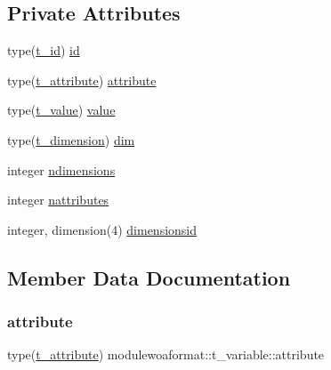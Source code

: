 \subsection*{Private Attributes}
\begin{DoxyCompactItemize}
\item 
type(\mbox{\hyperlink{structmodulewoaformat_1_1t__id}{t\+\_\+id}}) \mbox{\hyperlink{structmodulewoaformat_1_1t__variable_ad05690373ef83e0f32abd5dc5c2b76ca}{id}}
\item 
type(\mbox{\hyperlink{structmodulewoaformat_1_1t__attribute}{t\+\_\+attribute}}) \mbox{\hyperlink{structmodulewoaformat_1_1t__variable_aae9db64c84077262df5609101605bcf6}{attribute}}
\item 
type(\mbox{\hyperlink{structmodulewoaformat_1_1t__value}{t\+\_\+value}}) \mbox{\hyperlink{structmodulewoaformat_1_1t__variable_af0561c343e65e87d785749c5348be26f}{value}}
\item 
type(\mbox{\hyperlink{structmodulewoaformat_1_1t__dimension}{t\+\_\+dimension}}) \mbox{\hyperlink{structmodulewoaformat_1_1t__variable_a9e2c901743ade53253e35b5c8b948d4b}{dim}}
\item 
integer \mbox{\hyperlink{structmodulewoaformat_1_1t__variable_a76723a99321cec729b57508c62a3fca1}{ndimensions}}
\item 
integer \mbox{\hyperlink{structmodulewoaformat_1_1t__variable_acdc13b0d9ff1fb9b420c592d32bf1fa1}{nattributes}}
\item 
integer, dimension(4) \mbox{\hyperlink{structmodulewoaformat_1_1t__variable_ae02eac9694ef5e3203105b2ef8460f66}{dimensionsid}}
\end{DoxyCompactItemize}


\subsection{Member Data Documentation}
\mbox{\label{structmodulewoaformat_1_1t__variable_aae9db64c84077262df5609101605bcf6}} 
\subsubsection{\texorpdfstring{attribute}{attribute}}
{\footnotesize\ttfamily type(\mbox{\hyperlink{structmodulewoaformat_1_1t__attribute}{t\+\_\+attribute}}) modulewoaformat\+::t\+\_\+variable\+::attribute\hspace{0.3cm}{\ttfamily [private]}}

